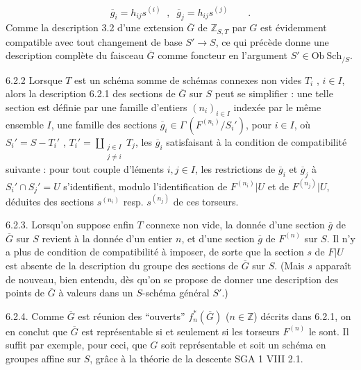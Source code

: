 \begin{equation*}
\overline{g}_i = h_{ij}s^{(i)} \;\;,\;\; \overline{g}_j = h_{ij}s^{(j)} \qquad .
\end{equation*}
Comme la description 3.2 d'une extension $\overline{G}$ de $\mathbb{Z}_{S,T}$ par $G$ est évidemment compatible avec tout changement de base $S' \longrightarrow S$, ce qui précède donne une description complète du faisceau $\overline{G}$ comme foncteur
en l'argument $S' \in \mathrm{Ob}\ \mathrm{Sch}_{/S}$.

6.2.2  Lorsque $T$ est un schéma somme de schémas connexes non vides $T_i$ , $i \in I$, alors la description 6.2.1 des sections de $\overline{G}$ sur $S$ peut se simplifier : une telle section est définie par une famille d'entiers $(n_i)_{i \in I}$ indexée par le même ensemble $I$, une famille des sections $\overline{g}_i \in \Gamma\,(F^{(n_i)}/S_i')$, pour $i \in I$, où $S_i' = S-T_i'$ , $T_i' = \coprod_{\substack{j \in I \\ j \neq i}} T_j$, les $\overline{g}_i$ satisfaisant à la condition de compatibilité suivante : pour tout couple d'léments $i,j \in I$, les restrictions de $\overline{g}_i$ et $\overline{g}_j$ à $S_i' \cap S_j' = U$ s'identifient, modulo l'identification de $F^{(n_i)}|U$ et de $F^{(n_j)}|U$, déduites des sections $s^{(n_i)}$ resp. $s^{(n_j)}$ de ces torseurs.

6.2.3.  Lorsqu'on suppose enfin $T$ connexe non vide, la donnée d'une section $\overline{g}$ de $\overline{G}$ sur $S$ revient à la donnée d'un entier $n$, et d'une section $\overline{g}$ de $F^{(n)}$ sur $S$. Il n'y a plus de condition de compatibilité à imposer, de sorte que la section $s$ de $F|U$ est absente de la description du groupe des sections de $\overline{G}$ sur $S$. (Mais $s$ apparaît de nouveau, bien entendu, dès qu'on se propose de donner une description des points de $\overline{G}$ à valeurs dans un $S$-schéma général $S'$.)

6.2.4.  Comme $\overline{G}$ est réunion des ``ouverts'' $f^*_n(\overline{G})$ ($n \in \mathbb{Z}$) décrits dans 6.2.1, on en conclut que $\overline{G}$ est représentable si et seulement si les torseurs $F^{(n)}$ le sont. Il suffit par exemple, pour ceci, que $G$ soit représentable et soit un schéma en groupes affine sur $S$, grâce à la théorie de la descente SGA 1 VIII 2.1.



